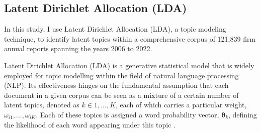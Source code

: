 \documentclass[12pt, letterpaper]{article}
\begin{document}
%
%
%
%

\subsection{Latent Dirichlet Allocation (LDA)}

In this study, I use Latent Dirichlet Allocation (LDA), a topic modeling technique, to identify latent topics within a comprehensive corpus of 121,839 firm annual reports spanning the years 2006 to 2022. 



Latent Dirichlet Allocation (LDA) is a generative statistical model that is widely employed for topic modelling within the field of natural language processing (NLP). Its effectiveness hinges on the fundamental assumption that each document in a given corpus can be seen as a mixture of a certain number of latent topics, denoted as $k \in {1, ..., K}$, each of which carries a particular weight, $\omega_{i1}, ..., \omega_{iK}$. Each of these topics is assigned a word probability vector, $\mathbf{\theta}_k$, defining the likelihood of each word appearing under this topic \cite{Blei2003-ay}.
\end{document}
